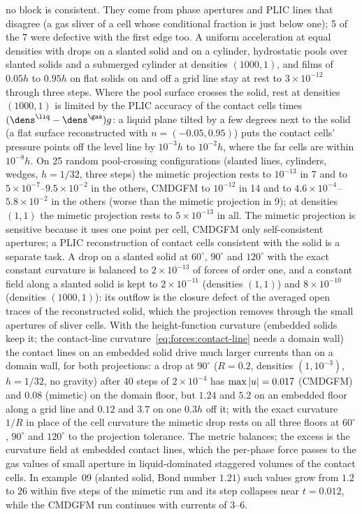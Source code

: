 no block is consistent. They come from phase apertures and PLIC lines that
disagree (a gas sliver of a cell whose conditional fraction is just below
one); 5 of the 7 were defective with the first edge too. A uniform acceleration at equal densities
with drops on a slanted solid and on a cylinder, hydrostatic pools over
slanted solids and a submerged cylinder at densities $(1000,1)$, and films of
$0.05h$ to $0.95h$ on flat solids on and off a grid line stay at rest to
$3\times10^{-12}$ through three steps. Where the pool surface crosses the
solid, rest at densities $(1000,1)$ is limited by the PLIC accuracy of the
contact cells times $(\dens^{\liq}-\dens^{\gas})g$: a liquid plane tilted by a
few degrees next to the solid (a flat surface reconstructed with
$n=(-0.05,0.95)$) puts the contact cells' pressure points off the level line
by $10^{-3}h$ to $10^{-2}h$, where the far cells are within $10^{-8}h$. On 25
random pool-crossing configurations (slanted lines, cylinders, wedges,
$h=1/32$, three steps) the mimetic projection rests to $10^{-13}$ in 7 and to
$5\times10^{-7}$--$9.5\times10^{-2}$ in the others, CMDGFM to $10^{-12}$ in 14
and to $4.6\times10^{-4}$--$5.8\times10^{-2}$ in the others (worse than the
mimetic projection in 9); at densities $(1,1)$ the mimetic projection rests to $5\times10^{-13}$ in all.
The mimetic projection is sensitive because it uses one point per cell,
CMDGFM only self-consistent apertures; a PLIC reconstruction of contact cells
consistent with the solid is a separate task. A drop on a
slanted solid at $60^\circ$, $90^\circ$ and $120^\circ$ with the exact
constant curvature is balanced to $2\times10^{-13}$ of forces of order one,
and a constant field along a slanted solid is kept to $2\times10^{-11}$
(densities $(1,1)$) and $8\times10^{-10}$ (densities $(1000,1)$): its outflow is
the closure defect of the averaged open traces of the reconstructed solid,
which the projection removes through the small apertures of sliver cells.
With the height-function curvature (embedded solids keep it; the contact-line
curvature~\cref{eq:forces:contact-line} needs a domain wall) the contact
lines on an embedded solid
drive much larger currents than on a domain wall, for both projections: a
drop at $90^\circ$ ($R=0.2$, densities $(1,10^{-3})$, $h=1/32$, no gravity)
after $40$ steps of $2\times10^{-4}$ has $\max\left\lvert u \right\rvert=0.017$ (CMDGFM) and
$0.08$ (mimetic) on the domain floor, but $1.24$ and $5.2$ on an embedded
floor along a grid line and $0.12$ and $3.7$ on one $0.3h$ off it; with the
exact curvature $1/R$ in place of the cell curvature the mimetic drop rests
on all three floors at $60^\circ$, $90^\circ$ and $120^\circ$ to the
projection tolerance. The metric balances; the excess is the curvature field
at embedded contact lines, which the per-phase force passes to the gas values
of small aperture in liquid-dominated staggered volumes of the contact cells.
In example~09 (slanted solid, Bond number $1.21$) such values grow from $1.2$
to $26$ within five steps of the mimetic run and its step collapses near
$t=0.012$, while the CMDGFM run continues with currents of $3$--$6$.

